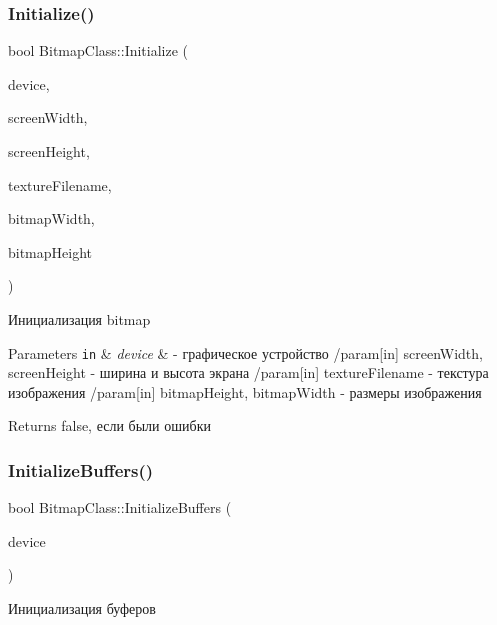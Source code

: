 \subsubsection{\texorpdfstring{Initialize()}{Initialize()}}
{\footnotesize\ttfamily bool Bitmap\+Class\+::\+Initialize (\begin{DoxyParamCaption}\item[{I\+D3\+D11\+Device $\ast$}]{device,  }\item[{int}]{screen\+Width,  }\item[{int}]{screen\+Height,  }\item[{\hyperlink{class_path_class}{Path\+Class} $\ast$}]{texture\+Filename,  }\item[{int}]{bitmap\+Width,  }\item[{int}]{bitmap\+Height }\end{DoxyParamCaption})}

Инициализация bitmap 
\begin{DoxyParams}[1]{Parameters}
\mbox{\tt in}  & {\em device} & -\/ графическое устройство /param\mbox{[}in\mbox{]} screen\+Width, screen\+Height -\/ ширина и высота экрана /param\mbox{[}in\mbox{]} texture\+Filename -\/ текстура изображения /param\mbox{[}in\mbox{]} bitmap\+Height, bitmap\+Width -\/ размеры изображения \\
\hline
\end{DoxyParams}
\begin{DoxyReturn}{Returns}
false, если были ошибки 
\end{DoxyReturn}
\mbox{\label{class_bitmap_class_a664110a255531e1dd980ebb85fc6d3ca}} 
\subsubsection{\texorpdfstring{Initialize\+Buffers()}{InitializeBuffers()}}
{\footnotesize\ttfamily bool Bitmap\+Class\+::\+Initialize\+Buffers (\begin{DoxyParamCaption}\item[{I\+D3\+D11\+Device $\ast$}]{device }\end{DoxyParamCaption})\hspace{0.3cm}{\ttfamily [private]}}



Инициализация буферов 


